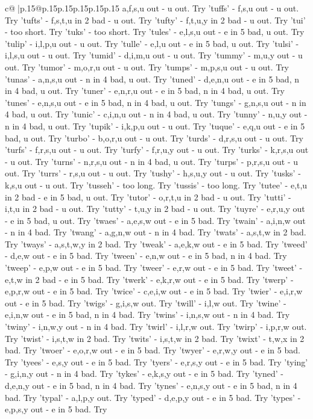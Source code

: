 \documentclass{article}
\begin{document}
{\begin{supertabular}{c@{$\;$}|p{.15\linewidth}@{}p{.15\linewidth}p{.15\linewidth}p{.15\linewidth}p{.15\linewidth}p{.15\linewidth}}
{{{a,f,s,u out {-} u out. Try 'tuffs' {-} f,s,u out {-} u out. Try 'tufts' {-} f,s,t,u in 2 bad {-} u out. Try 'tufty' {-} f,t,u,y in 2 bad {-} u out. Try 'tui' {-} too short. Try 'tuks' {-} too short. Try 'tules' {-} e,l,s,u out {-} e in 5 bad, u out. Try 'tulip' {-} i,l,p,u out {-} u out. Try 'tulle' {-} e,l,u out {-} e in 5 bad, u out. Try 'tulsi' {-} i,l,s,u out {-} u out. Try 'tumid' {-} d,i,m,u out {-} u out. Try 'tummy' {-} m,u,y out {-} u out. Try 'tumor' {-} m,o,r,u out {-} u out. Try 'tumps' {-} m,p,s,u out {-} u out. Try 'tunas' {-} a,n,s,u out {-} n in 4 bad, u out. Try 'tuned' {-} d,e,n,u out {-} e in 5 bad, n in 4 bad, u out. Try 'tuner' {-} e,n,r,u out {-} e in 5 bad, n in 4 bad, u out. Try 'tunes' {-} e,n,s,u out {-} e in 5 bad, n in 4 bad, u out. Try 'tungs' {-} g,n,s,u out {-} n in 4 bad, u out. Try 'tunic' {-} c,i,n,u out {-} n in 4 bad, u out. Try 'tunny' {-} n,u,y out {-} n in 4 bad, u out. Try 'tupik' {-} i,k,p,u out {-} u out. Try 'tuque' {-} e,q,u out {-} e in 5 bad, u out. Try 'turbo' {-} b,o,r,u out {-} u out. Try 'turds' {-} d,r,s,u out {-} u out. Try 'turfs' {-} f,r,s,u out {-} u out. Try 'turfy' {-} f,r,u,y out {-} u out. Try 'turks' {-} k,r,s,u out {-} u out. Try 'turns' {-} n,r,s,u out {-} n in 4 bad, u out. Try 'turps' {-} p,r,s,u out {-} u out. Try 'turrs' {-} r,s,u out {-} u out. Try 'tushy' {-} h,s,u,y out {-} u out. Try 'tusks' {-} k,s,u out {-} u out. Try 'tusseh' {-} too long. Try 'tussis' {-} too long. Try 'tutee' {-} e,t,u in 2 bad {-} e in 5 bad, u out. Try 'tutor' {-} o,r,t,u in 2 bad {-} u out. Try 'tutti' {-} i,t,u in 2 bad {-} u out. Try 'tutty' {-} t,u,y in 2 bad {-} u out. Try 'tuyre' {-} e,r,u,y out {-} e in 5 bad, u out. Try 'twaes' {-} a,e,s,w out {-} e in 5 bad. Try 'twain' {-} a,i,n,w out {-} n in 4 bad. Try 'twang' {-} a,g,n,w out {-} n in 4 bad. Try 'twats' {-} a,s,t,w in 2 bad. Try 'tways' {-} a,s,t,w,y in 2 bad. Try 'tweak' {-} a,e,k,w out {-} e in 5 bad. Try 'tweed' {-} d,e,w out {-} e in 5 bad. Try 'tween' {-} e,n,w out {-} e in 5 bad, n in 4 bad. Try 'tweep' {-} e,p,w out {-} e in 5 bad. Try 'tweer' {-} e,r,w out {-} e in 5 bad. Try 'tweet' {-} e,t,w in 2 bad {-} e in 5 bad. Try 'twerk' {-} e,k,r,w out {-} e in 5 bad. Try 'twerp' {-} e,p,r,w out {-} e in 5 bad. Try 'twice' {-} c,e,i,w out {-} e in 5 bad. Try 'twier' {-} e,i,r,w out {-} e in 5 bad. Try 'twigs' {-} g,i,s,w out. Try 'twill' {-} i,l,w out. Try 'twine' {-} e,i,n,w out {-} e in 5 bad, n in 4 bad. Try 'twins' {-} i,n,s,w out {-} n in 4 bad. Try 'twiny' {-} i,n,w,y out {-} n in 4 bad. Try 'twirl' {-} i,l,r,w out. Try 'twirp' {-} i,p,r,w out. Try 'twist' {-} i,s,t,w in 2 bad. Try 'twits' {-} i,s,t,w in 2 bad. Try 'twixt' {-} t,w,x in 2 bad. Try 'twoer' {-} e,o,r,w out {-} e in 5 bad. Try 'twyer' {-} e,r,w,y out {-} e in 5 bad. Try 'tyees' {-} e,s,y out {-} e in 5 bad. Try 'tyers' {-} e,r,s,y out {-} e in 5 bad. Try 'tying' {-} g,i,n,y out {-} n in 4 bad. Try 'tykes' {-} e,k,s,y out {-} e in 5 bad. Try 'tyned' {-} d,e,n,y out {-} e in 5 bad, n in 4 bad. Try 'tynes' {-} e,n,s,y out {-} e in 5 bad, n in 4 bad. Try 'typal' {-} a,l,p,y out. Try 'typed' {-} d,e,p,y out {-} e in 5 bad. Try 'types' {-} e,p,s,y out {-} e in 5 bad. Try }}}
\end{supertabular}}
\end{document}
